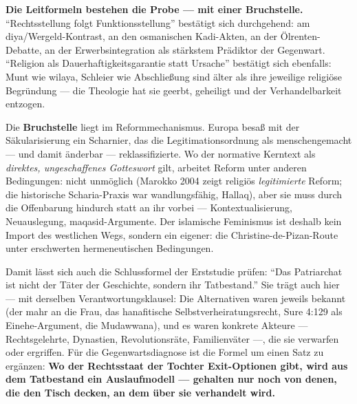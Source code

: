 \documentclass[11pt,a4paper,ngerman]{scrartcl}
\newcommand{\chipbase}[2]{\hspace{0pt}{\footnotesize\textcolor{#1}{[\textsc{#2}]}}}
\newcommand{\chipplausibel}[1]{\chipbase{chipamber}{#1}}
\newcommand{\chipumstritten}[1]{\chipbase{chipred}{#1}}
\begin{document}
\textbf{Die Leitformeln bestehen die Probe --- mit einer Bruchstelle.} \enquote{Rechtsstellung folgt Funktionsstellung} bestätigt sich durchgehend: am diya/Wergeld-Kontrast, an den osmanischen Kadi-Akten, an der Ölrenten-Debatte, an der Erwerbsintegration als stärkstem Prädiktor der Gegenwart. \enquote{Religion als Dauerhaftigkeitsgarantie statt Ursache} bestätigt sich ebenfalls: Munt wie wilaya, Schleier wie Abschließung sind älter als ihre jeweilige religiöse Begründung --- die Theologie hat sie geerbt, geheiligt und der Verhandelbarkeit entzogen. \chipplausibel{plausibel}

Die \textbf{Bruchstelle} liegt im Reformmechanismus. Europa besaß mit der Säkularisierung ein Scharnier, das die Legitimationsordnung als menschengemacht --- und damit änderbar --- reklassifizierte. Wo der normative Kerntext als \emph{direktes, ungeschaffenes Gotteswort} gilt, arbeitet Reform unter anderen Bedingungen: nicht unmöglich (Marokko 2004 zeigt religiös \emph{legitimierte} Reform; die historische Scharia-Praxis war wandlungsfähig, Hallaq), aber sie muss durch die Offenbarung hindurch statt an ihr vorbei --- Kontextualisierung, Neuauslegung, maqasid-Argumente. Der islamische Feminismus ist deshalb kein Import des westlichen Wegs, sondern ein eigener: die Christine-de-Pizan-Route unter erschwerten hermeneutischen Bedingungen. \chipumstritten{umstritten}

Damit lässt sich auch die Schlussformel der Erststudie prüfen: \enquote{Das Patriarchat ist nicht der Täter der Geschichte, sondern ihr Tatbestand.} Sie trägt auch hier --- mit derselben Verantwortungsklausel: Die Alternativen waren jeweils bekannt (der mahr an die Frau, das hanafitische Selbstverheiratungsrecht, Sure 4:129 als Einehe-Argument, die Mudawwana), und es waren konkrete Akteure --- Rechtsgelehrte, Dynastien, Revolutionsräte, Familienväter ---, die sie verwarfen oder ergriffen. Für die Gegenwartsdiagnose ist die Formel um einen Satz zu ergänzen: \textbf{Wo der Rechtsstaat der Tochter Exit-Optionen gibt, wird aus dem Tatbestand ein Auslaufmodell --- gehalten nur noch von denen, die den Tisch decken, an dem über sie verhandelt wird.}
\end{document}
